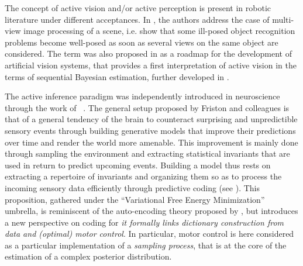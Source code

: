 \documentclass{article} %
\begin{document}
	
	
	
	The concept of active vision and/or active perception is present in robotic literature under different acceptances. In \cite{aloimonos1988active}, the authors address the case of multi-view image processing of a scene, i.e. show that some ill-posed object recognition problems become well-posed as soon as several views on the  same object are considered. The term was also proposed in \cite{bajcsy1988active} as a roadmap for the development of artificial vision systems, that provides a first interpretation of active vision in the terms of sequential Bayesian estimation, further developed in \cite{najemnik2005optimal,butko2010infomax,ahmad2013active,potthast2016active}.
	
The active inference paradigm was independently introduced in neuroscience through the work of ~\cite{friston2010free,friston2012perceptions}. %
The general setup proposed by Friston and colleagues is that of a general tendency of the brain to counteract surprising and unpredictible sensory events through building generative models that improve their predictions over time and render the world more amenable. This improvement is mainly done through sampling the environment and extracting statistical invariants that are used in return to predict upcoming events.
Building a model thus rests on extracting a repertoire of invariants and organizing them so as to process the incoming sensory data efficiently through predictive coding (see \cite{rao1999predictive}). This proposition, gathered under the ``Variational Free Energy Minimization'' umbrella, is reminiscent of the auto-encoding theory proposed by \cite{hinton1994autoencoders}, but introduces a new perspective on coding
for \emph{it formally links dictionary construction from data and (optimal) motor control}.
In particular, motor control is here considered as a particular implementation of a \emph{sampling process}, that is at the core of the estimation of a complex posterior distribution. 
\end{document}
